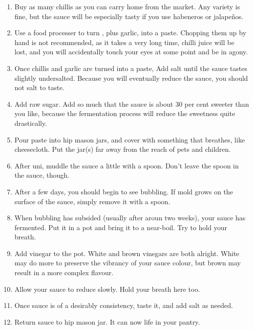 \begin{enumerate}
    \item Buy as many chillis as you can carry home from the market. Any variety is fine, but the sauce will be especially tasty if you use habeneros or jalape{\~n}os.
    \item Use a food processer to turn , plus garlic, into a paste. Chopping them up by hand is not recommended, as it takes a very long time, chilli juice will be lost, and you will accidentally touch your eyes at some point and be in agony.
    \item Once chillis and garlic are turned into a paste, Add salt until the sauce tastes slightly undersalted. Because you will eventually reduce the sauce, you should not salt to taste.
    \item Add raw sugar. Add so much that the sauce is about 30 per cent sweeter than you like, because the fermentation process will reduce the sweetness quite drastically.
    \item Pour paste into hip mason jars, and cover with something that breathes, like cheesecloth. Put the jar(s) far away from the reach of pets and children.
    \item After uni, muddle the sauce a little with a spoon. Don't leave the spoon in the sauce, though.
    \item After a few days, you should begin to see bubbling. If mold grows on the surface of the sauce, simply remove it with a spoon.
    \item When bubbling has subsided (usually after aroun two weeks), your sauce has fermented. Put it in a pot and bring it to a near-boil. Try to hold your breath.
    \item Add vinegar to the pot. White and brown vinegars are both alright. White may do more to preserve the vibrancy of your sauce colour, but brown may result in a more complex flavour.
    \item Allow your sauce to reduce slowly. Hold your breath here too.
    \item Once sauce is of a desirably consistency, taste it, and add salt as needed.
    \item Return sauce to hip mason jar. It can now life in your pantry.
\end{enumerate}



\vfill
\pagebreak


